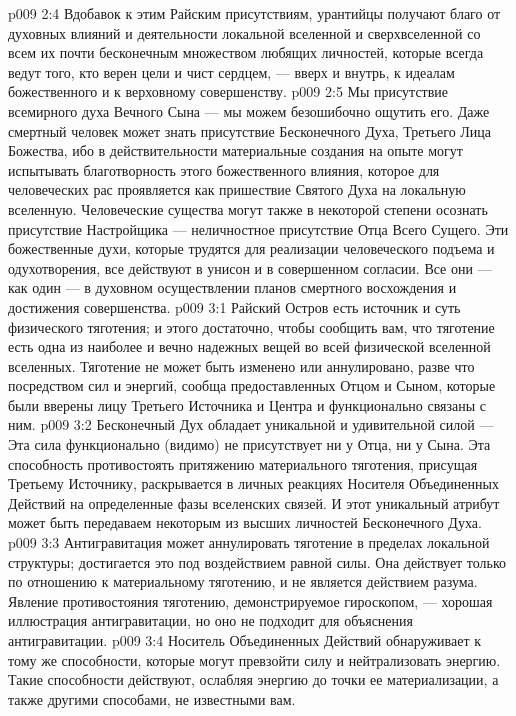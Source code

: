 \vs p009 2:4 Вдобавок к этим Райским присутствиям, урантийцы получают благо от духовных влияний и деятельности локальной вселенной и сверхвселенной со всем их почти бесконечным множеством любящих личностей, которые всегда ведут того, кто верен цели и чист сердцем, --- вверх и внутрь, к идеалам божественного и к верховному совершенству.
\vs p009 2:5 Мы  присутствие всемирного духа Вечного Сына --- мы можем безошибочно ощутить его. Даже смертный человек может знать присутствие Бесконечного Духа, Третьего Лица Божества, ибо в действительности материальные создания на опыте могут испытывать благотворность этого божественного влияния, которое для человеческих рас проявляется как пришествие Святого Духа на локальную вселенную. Человеческие существа могут также в некоторой степени осознать присутствие Настройщика --- неличностное присутствие Отца Всего Сущего. Эти божественные духи, которые трудятся для реализации человеческого подъема и одухотворения, все действуют в унисон и в совершенном согласии. Все они --- как один --- в духовном осуществлении планов смертного восхождения и достижения совершенства.
\vs p009 3:1 Райский Остров есть источник и суть физического тяготения; и этого достаточно, чтобы сообщить вам, что тяготение есть одна из наиболее  и вечно надежных вещей во всей физической вселенной вселенных. Тяготение не может быть изменено или аннулировано, разве что посредством сил и энергий, сообща предоставленных Отцом и Сыном, которые были вверены лицу Третьего Источника и Центра и функционально связаны с ним.
\vs p009 3:2 \pc Бесконечный Дух обладает уникальной и удивительной силой ---  Эта сила функционально (видимо) не присутствует ни у Отца, ни у Сына. Эта способность противостоять притяжению материального тяготения, присущая Третьему Источнику, раскрывается в личных реакциях Носителя Объединенных Действий на определенные фазы вселенских связей. И этот уникальный атрибут может быть передаваем некоторым из высших личностей Бесконечного Духа.
\vs p009 3:3 \pc Антигравитация может аннулировать тяготение в пределах локальной структуры; достигается это под воздействием равной силы. Она действует только по отношению к материальному тяготению, и не является действием разума. Явление противостояния тяготению, демонстрируемое гироскопом, --- хорошая иллюстрация  антигравитации, но оно не подходит для объяснения  антигравитации.
\vs p009 3:4 Носитель Объединенных Действий обнаруживает к тому же способности, которые могут превзойти силу и нейтрализовать энергию. Такие способности действуют, ослабляя энергию до точки ее материализации, а также другими способами, не известными вам.
